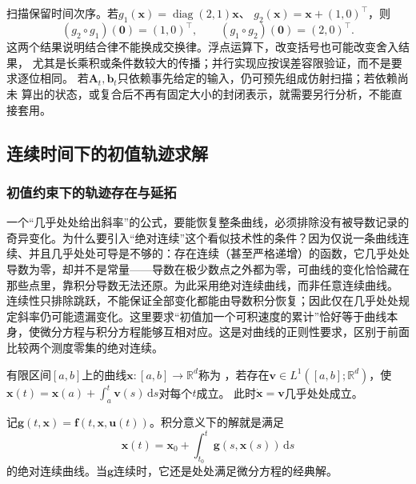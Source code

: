 扫描保留时间次序。若$g_1(\bm x)=\operatorname{diag}(2,1)\bm x$、
$g_2(\bm x)=\bm x+(1,0)^\top$，则
\[
  (g_2\circ g_1)(\bm0)=(1,0)^\top,\qquad
  (g_1\circ g_2)(\bm0)=(2,0)^\top.
\]
这两个结果说明结合律不能换成交换律。浮点运算下，改变括号也可能改变舍入结果，
尤其是长乘积或条件数较大的传播；并行实现应按误差容限验证，而不是要求逐位相同。
若$\bm A_t,\bm b_t$只依赖事先给定的输入，仍可预先组成仿射扫描；若依赖尚未
算出的状态，或复合后不再有固定大小的封闭表示，就需要另行分析，不能直接套用。

\subsection{连续时间下的初值轨迹求解}


\subsubsection{初值约束下的轨迹存在与延拓}
一个“几乎处处给出斜率”的公式，要能恢复整条曲线，必须排除没有被导数记录的
奇异变化。为什么要引入“绝对连续”这个看似技术性的条件？因为仅说一条曲线连续、并且几乎处处可导是不够的：存在连续（甚至严格递增）的函数，它几乎处处导数为零，却并不是常量——导数在极少数点之外都为零，可曲线的变化恰恰藏在那些点里，靠积分导数无法还原。为此采用绝对连续曲线，而非任意连续曲线。
连续性只排除跳跃，不能保证全部变化都能由导数积分恢复；因此仅在几乎处处规定斜率仍可能遗漏变化。这里要求“初值加一个可积速度的累计”恰好等于曲线本身，使微分方程与积分方程能够互相对应。这是对曲线的正则性要求，区别于前面比较两个测度零集的绝对连续。
\begin{definition}[绝对连续曲线]
  \label{def:dynamical-absolutely-continuous-curve}
  有限区间$[a,b]$上的曲线$\bm x:[a,b]\to\mathbb R^d$称为
  ，若存在$\bm v\in L^1([a,b];\mathbb R^d)$，使
  $\bm x(t)=\bm x(a)+\int_a^t\bm v(s)\,\mathrm ds$对每个$t$成立。
  此时$\dot{\bm x}=\bm v$几乎处处成立。
\end{definition}
记$\bm g(t,\bm x)=\bm f(t,\bm x,\bm u(t))$。积分意义下的解就是满足
\begin{equation}
  \bm x(t)=\bm x_0+\int_{t_0}^t\bm g(s,\bm x(s))\,\mathrm ds
  \label{eq:dynamical-ivp-integral-form}
\end{equation}
的绝对连续曲线。当$\bm g$连续时，它还是处处满足微分方程的经典解。

